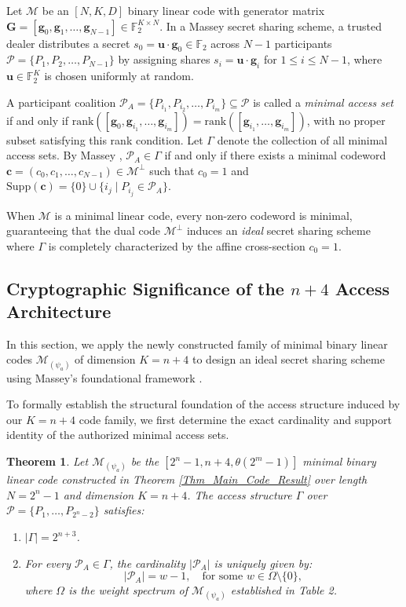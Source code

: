\documentclass[10pt,a4paper]{amsart}
\newtheorem{theorem}{Theorem}%
\begin{document}
Let $\mathcal{M}$ be an $[N, K, D]$ binary linear code with generator matrix $\mathbf{G} = [\mathbf{g}_0, \mathbf{g}_1, \ldots, \mathbf{g}_{N-1}] \in \mathbb{F}_2^{K \times N}$. In a Massey secret sharing scheme, a trusted dealer distributes a secret $s_0 = \mathbf{u} \cdot \mathbf{g}_0 \in \mathbb{F}_2$ across $N-1$ participants $\mathcal{P} = \{P_1, P_2, \ldots, P_{N-1}\}$ by assigning shares $s_i = \mathbf{u} \cdot \mathbf{g}_i$ for $1 \le i \le N-1$, where $\mathbf{u} \in \mathbb{F}_2^K$ is chosen uniformly at random.

A participant coalition $\mathcal{P}_A = \{P_{i_1}, P_{i_2}, \ldots, P_{i_m}\} \subseteq \mathcal{P}$ is called a \emph{minimal access set} if and only if $\text{rank}([\mathbf{g}_0, \mathbf{g}_{i_1}, \ldots, \mathbf{g}_{i_m}]) = \text{rank}([\mathbf{g}_{i_1}, \ldots, \mathbf{g}_{i_m}])$, with no proper subset satisfying this rank condition. Let $\Gamma$ denote the collection of all minimal access sets. By Massey \cite{Massey1993}, $\mathcal{P}_A \in \Gamma$ if and only if there exists a minimal codeword $\mathbf{c} = (c_0, c_1, \ldots, c_{N-1}) \in \mathcal{M}^\perp$ such that $c_0 = 1$ and $\mathrm{Supp}(\mathbf{c}) = \{0\} \cup \{i_j \mid P_{i_j} \in \mathcal{P}_A\}$.

When $\mathcal{M}$ is a minimal linear code, every non-zero codeword is minimal, guaranteeing that the dual code $\mathcal{M}^\perp$ induces an \emph{ideal} secret sharing scheme where $\Gamma$ is completely characterized by the affine cross-section $c_0 = 1$.



\subsection{Cryptographic Significance of the $n+4$ Access Architecture}
 In this section, we apply the newly constructed family of minimal binary linear codes $\mathcal{M}_{(\psi_a)}$ of dimension $K = n+4$ to design an ideal secret sharing scheme using Massey's foundational framework \cite{Massey1993}.

To formally establish the structural foundation of the access structure induced by our $K = n+4$ code family, we first determine the exact cardinality and support identity of the authorized minimal access sets.


\begin{theorem}\label{Thm:SSS_Construction}
Let $\mathcal{M}_{(\psi_a)}$ be the $[2^n-1, n+4, \theta(2^m-1)]$ minimal binary linear code constructed in Theorem \ref{Thm_Main_Code_Result} over length $N = 2^n - 1$ and dimension $K = n+4$. The access structure $\Gamma$ over $\mathcal{P} = \{P_1, \ldots, P_{2^n-2}\}$ satisfies:
\begin{enumerate}
    \item  $|\Gamma| = 2^{n+3}$.
    \item  For every $\mathcal{P}_A \in \Gamma$, the cardinality $|\mathcal{P}_A|$ is uniquely given by:
    \[
    |\mathcal{P}_A| = w - 1, \quad \text{for some } w \in \Omega \setminus \{0\},
    \]
    where $\Omega$ is the weight spectrum of $\mathcal{M}_{(\psi_a)}$ established in Table 2.
\end{enumerate}
\end{theorem}
\end{document}
